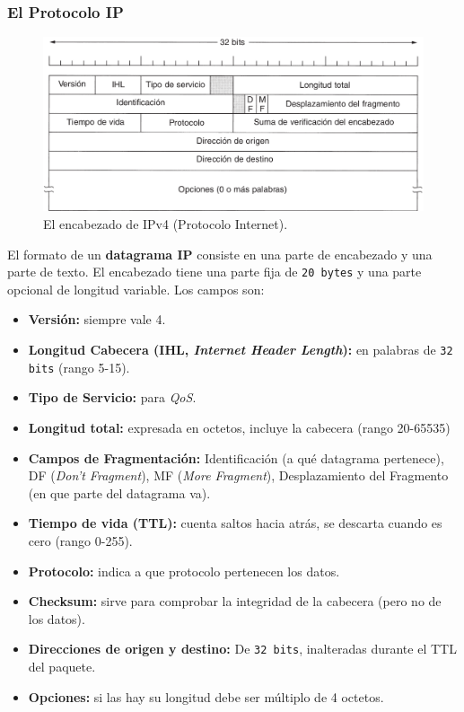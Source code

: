 \documentclass[10pt,a4paper]{article}
\begin{document}
\subsubsection{El Protocolo IP}

\begin{figure}[ht!]
  \caption{El encabezado de IPv4 (Protocolo Internet).}
  \label{fig:datagrama_ip}
  \centerline{\includegraphics[width=0.85\textwidth-\fboxrule-\fboxrule]{imgs/datagrama_ip.png}}
\end{figure}

El formato de un \textbf{datagrama IP} consiste en una parte de encabezado y una parte de texto. El encabezado tiene una parte fija de \texttt{20 bytes} y una parte opcional de longitud variable. Los  campos son:

\begin{itemize}
\item \textbf{Versión:} siempre vale 4.
\item \textbf{Longitud Cabecera (IHL, \textit{Internet Header Length}):} en palabras de \texttt{32 bits} (rango 5-15).
\item \textbf{Tipo de Servicio:} para \textit{QoS}.
\item \textbf{Longitud total:} expresada en octetos, incluye la cabecera (rango 20-65535)
\item \textbf{Campos de Fragmentación:} Identificación (a qué datagrama pertenece), DF (\textit{Don't Fragment}), MF (\textit{More Fragment}), Desplazamiento del Fragmento (en que parte del datagrama va).
\item \textbf{Tiempo de vida (TTL):} cuenta saltos hacia atrás, se descarta cuando es cero (rango 0-255).
\item \textbf{Protocolo:} indica a que protocolo pertenecen los datos.
\item \textbf{Checksum:} sirve para comprobar la integridad de la cabecera (pero no de los datos).
\item \textbf{Direcciones de origen y destino:} De \texttt{32 bits}, inalteradas durante el TTL del paquete.
\item \textbf{Opciones:} si las hay su longitud debe ser múltiplo de 4 octetos.

\end{itemize}
\end{document}
